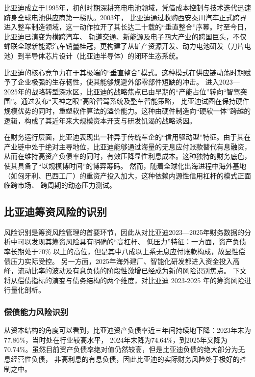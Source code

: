 \documentclass[12pt,a4paper,fontset=windows,UTF8]{ctexart}
\begin{document}
比亚迪成立于1995年，初创时期深耕充电电池领域，凭借成本控制与技术迭代迅速跻身全球电池供应商第一梯队。2003年，
  比亚迪通过收购西安秦川汽车正式跨界进入整车制造领域，这一动作拉开了其长达二十载的“垂直整合”序幕。时至今日，比亚迪已演变为横跨汽车、
  轨道交通、新能源及电子四大产业的跨国巨头，不仅蝉联全球新能源汽车销量桂冠，更构建了从矿产资源开发、动力电池研发（刀片电池）到半导体芯片设计（比亚迪半导体）的闭环生态系统。

比亚迪的核心竞争力在于其极端的“垂直整合”模式。这种模式在供应链动荡时期赋予了企业极强的生存韧性，使其能够规避外部零部件短缺的冲击。
  进入2023—2025年的战略转型深水区，比亚迪的战略焦点已由早期的“产能占位”转向“智驾突围”。通过发布“天神之眼”高阶智驾系统及整车智能策略，
  比亚迪试图在保持硬件规模优势的同时，重塑软件算法的溢价能力。这种由硬件制造向“硬软一体”跨越的逻辑，构成了其近年来大规模资本开支与研发饥渴的战略诱因。

在财务运行层面，比亚迪表现出一种异于传统车企的“信用驱动型”特征。由于其在产业链中处于绝对主导地位，比亚迪能够通过海量的无息应付账款替代有息融资，
  从而在维持高资产负债率的同时，有效压降显性利息成本。这种独特的财务底色，使其具备了“以规模博时间”的博弈筹码。
  然而，随着全球化出海进程中海外基地（如匈牙利、巴西工厂）的重资产投入加大，这种依赖内源性信用杠杆的模式正面临跨市场、
  跨周期的动态压力测试。

\subsection{比亚迪筹资风险的识别}

风险识别是筹资风险管理的首要环节，因此从对比亚迪2023—2025年财务数据的分析中可以发现其筹资风险具有明确的“高杠杆、
  低压力”特征：一方面，资产负债率长期处于70\% 以上的高位，但是其中八成以上系无息应付账款构成，故显性偿债压力实际受控。
  另一方面，2025年海外建厂、智能化研发都进入资金投入高峰，流动比率的波动及有息负债的阶段性激增已经成为新的风险识别焦点。
  下文将从偿债指标的演变与债务结构的两个维度，对比亚迪 2023-2025 年的筹资风险进行量化剖析。

\subsubsection{偿债能力风险识别}

从资本结构的角度可以看到，比亚迪资产负债率近三年间持续地下降：2023年末为77.86\%，当时处在行业较高水平，
  2024年末降为74.64\%，到2025年又降为70.74\%。虽然目前资产负债率绝对值仍然较高，但是比亚迪负债的绝大部分为无息经营性负债，
  非高利息的有息负债，因此比亚迪的实际财务风险处于极好的控制之中。
\end{document}
